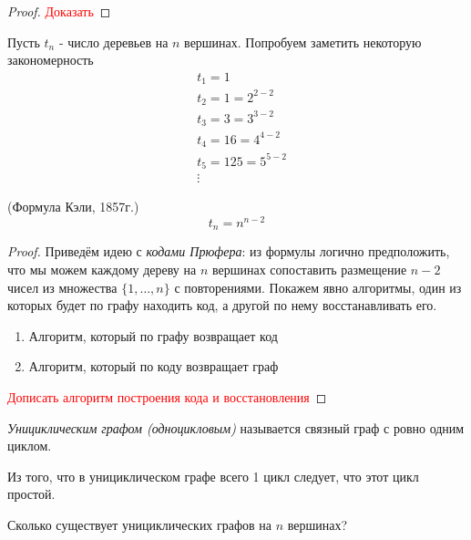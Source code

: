 \begin{proof}
	\textcolor{red}{Доказать}
\end{proof}

\begin{example}
	Пусть $t_n$ - число деревьев на $n$ вершинах. Попробуем заметить некоторую закономерность
	\begin{align*}
		&{t_1 = 1}
		\\
		&{t_2 = 1 = 2^{2 - 2}}
		\\
		&{t_3 = 3 = 3^{3 - 2}}
		\\
		&{t_4 = 16 = 4^{4 - 2}}
		\\
		&{t_5 = 125 = 5^{5 - 2}}
		\\
		&{\vdots}
	\end{align*}
\end{example}

\begin{theorem} (Формула Кэли, 1857г.)
	\[
		t_n = n^{n - 2}
	\]
\end{theorem}

\begin{proof}
	Приведём идею с \textit{кодами Прюфера}: из формулы логично предположить, что мы можем каждому дереву на $n$ вершинах сопоставить размещение $n - 2$ чисел из множества $\{1, \ldots, n\}$ с повторениями. Покажем явно алгоритмы, один из которых будет по графу находить код, а другой по нему восстанавливать его.
	\begin{enumerate}
		\item Алгоритм, который по графу возвращает код
		
		\item Алгоритм, который по коду возвращает граф
	\end{enumerate}
	
	\textcolor{red}{Дописать алгоритм построения кода и восстановления}
\end{proof}

\begin{definition}
	\textit{Унициклическим графом (одноцикловым)} называется связный граф с ровно одним циклом.
\end{definition}

\begin{note}
	Из того, что в унициклическом графе всего 1 цикл следует, что этот цикл простой.
\end{note}

\begin{example}
	Сколько существует унициклических графов на $n$ вершинах?
\end{example}